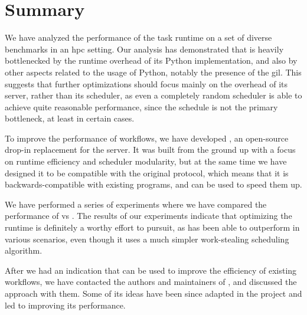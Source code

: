 \section*{Summary}
We have analyzed the performance of the \dask{} task runtime on a set of
diverse benchmarks in an \gls{hpc} setting. Our analysis has demonstrated that
\dask{} is heavily bottlenecked by the runtime overhead of its Python
implementation, and also by other aspects related to the usage of Python, notably the presence of
the \gls{gil}. This suggests that further optimizations should focus mainly on
the overhead of its server, rather than its scheduler, as even a completely random scheduler is
able to achieve quite reasonable performance, since the schedule is not the primary bottleneck, at
least in certain cases.

To improve the performance of \dask{} workflows, we have developed
\rsds{}, an open-source drop-in replacement for the \dask{}
server. It was built from the ground up with a focus on runtime efficiency and scheduler
modularity, but at the same time we have designed it to be compatible with the original
\dask{} protocol, which means that it is backwards-compatible with existing
\dask{} programs, and can be used to speed them up.

We have performed a series of experiments where we have compared the performance of
\rsds{} vs \dask{}. The results of our experiments indicate
that optimizing the runtime is definitely a worthy effort to pursuit, as
\rsds{} has been able to outperform \dask{} in various
scenarios, even though it uses a much simpler work-stealing scheduling algorithm.

After we had an indication that \rsds{} can be used to improve the efficiency
of existing \dask{} workflows, we have contacted the authors and maintainers of
\dask{}, and discussed the \rsds{} approach with
them. Some of its
ideas have been since adapted in the \dask{} project and led to improving its
performance.
